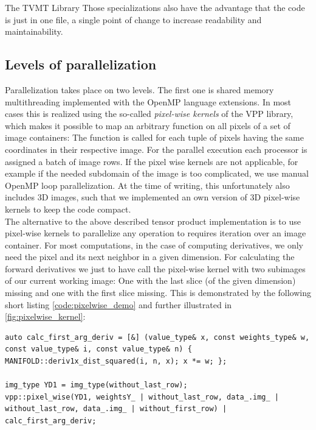 \begin{chapter}{The TVMT Library}
Those specializations also have the advantage that the code is just in one file, a single point of change to increase readability and maintainability.


\subsection{Levels of parallelization} %
\label{sub:Levels of parallelization}
Parallelization takes place on two levels. The first one is shared memory multithreading implemented with the OpenMP language extensions. In most cases this is realized 
using the so-called \textit{pixel-wise kernels} of the VPP library, which makes it possible to map an arbitrary function on all pixels of a set of image containers: The function is
called for each tuple of pixels having the same coordinates in their respective image. For the parallel execution each processor is assigned a batch of image rows.
If the pixel wise kernels are not applicable, for example if the needed subdomain of the image is too complicated, we use manual OpenMP loop parallelization. At the
time of writing, this unfortunately also includes 3D images, such that we implemented an own version of 3D pixel-wise kernels to keep the code compact.\\

The alternative to the above described tensor product implementation is to use pixel-wise kernels to parallelize any operation to requires iteration over an image container.
For most computations, in the case of computing derivatives, we only need the pixel and its next neighbor in a given dimension. For calculating the forward derivatives we just 
to have call the pixel-wise kernel with two subimages of our current working image: One with the last slice (of the given dimension) missing and one with the first slice missing.
This is demonstrated by the following short listing \ref{code:pixelwise_demo} and further illustrated in \ref{fig:pixelwise_kernel}:\\

\cppinline
\begin{lstlisting}[label=code:pixelwise_demo,caption={Pixel-wise forward derivative computation}]
auto calc_first_arg_deriv = [&] (value_type& x, const weights_type& w, const value_type& i, const value_type& n) { MANIFOLD::deriv1x_dist_squared(i, n, x); x *= w; }; 

img_type YD1 = img_type(without_last_row);
vpp::pixel_wise(YD1, weightsY_ | without_last_row, data_.img_ | without_last_row, data_.img_ | without_first_row) | calc_first_arg_deriv;
\end{lstlisting}


\end{chapter}
